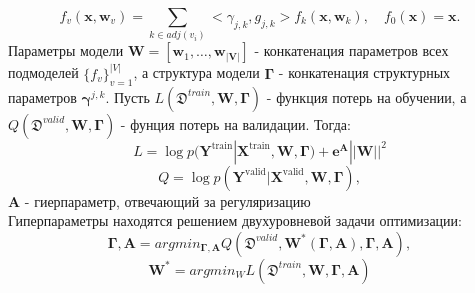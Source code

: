 \documentclass[12pt, twoside]{article}
\begin{document}
	 $$f_{v}(\textbf{x}, \textbf{w}_{v}) = \sum\limits_{k \in adj(v_i)} <\gamma_{j, k}, g_{j, k}>f_{k}(\textbf{x}, \textbf{w}_{k}), \quad f_{0}(\textbf{x}) = \textbf{x}.$$ 
	Параметры модели $\mathbf{W}=[\mathbf{w}_1,\dots,\mathbf{w}_\mathbf{|V|}]$ - конкатенация параметров всех подмоделей $\{f_{v}\}_{v = 1}^{|V|}$, а
	структура модели $\boldsymbol{\Gamma}$ - конкатенация структурных параметров $\boldsymbol{\gamma}^{j,k}$.
Пусть $L(\mathfrak{D}^{train},\mathbf{W},\boldsymbol{\Gamma})$ - функция потерь на обучении, а $Q(\mathfrak{D}^{valid},\mathbf{W},\boldsymbol{\Gamma})$ - фунция потерь на валидации. Тогда:
$$L =  \log p(\mathbf{Y}^\text{train}|\mathbf{X}^\text{train}, \mathbf{W}, \boldsymbol{\Gamma}) + \boldsymbol{e}^{\mathbf{A}}||\mathbf{W}||^2$$ 
$$Q =\log p(\mathbf{Y}^\text{valid}|\mathbf{X}^\text{valid}, \mathbf{W}, \boldsymbol{\Gamma}),
$$
$\mathbf{A}$ - гиерпараметр, отвечающий за регуляризацию \\
Гиперпараметры находятся решением двухуровневой задачи оптимизации:
$$\boldsymbol{\Gamma},\mathbf{A} = argmin_{\boldsymbol{\Gamma},\mathbf{A}} Q(\mathfrak{D}^{valid},\mathbf{W^*(\boldsymbol{\Gamma},\mathbf{A})},\boldsymbol{\Gamma},\mathbf{A}),$$
$$\mathbf{W^*} = argmin_W L(\mathfrak{D}^{train},\mathbf{W},\boldsymbol{\Gamma},\mathbf{A})$$
\end{document}
